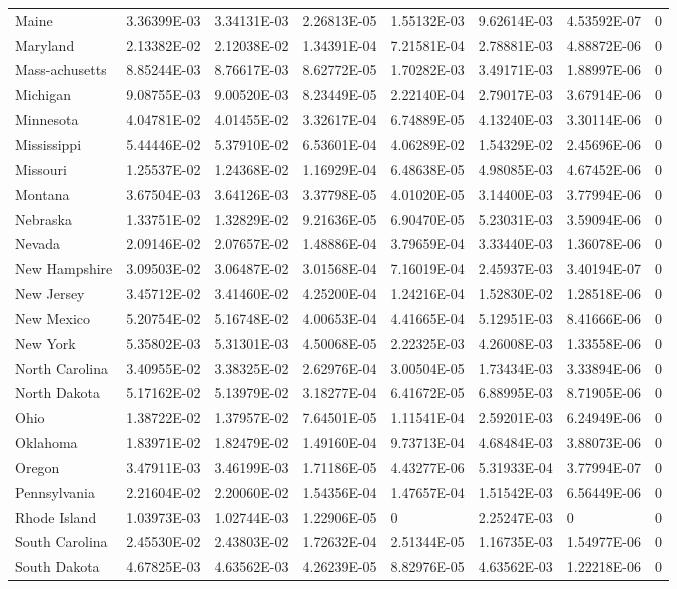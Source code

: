 \begin{longtable}[c]{p{0.75in}p{0.75in}p{0.75in}p{0.75in}p{0.75in}p{0.75in}p{0.75in}p{0.75in}}
Maine & 3.36399E-03 & 3.34131E-03 & 2.26813E-05 & 1.55132E-03 & 9.62614E-03 & 4.53592E-07 & 0 \tabularnewline
Maryland & 2.13382E-02 & 2.12038E-02 & 1.34391E-04 & 7.21581E-04 & 2.78881E-03 & 4.88872E-06 & 0 \tabularnewline
Mass-achusetts & 8.85244E-03 & 8.76617E-03 & 8.62772E-05 & 1.70282E-03 & 3.49171E-03 & 1.88997E-06 & 0 \tabularnewline
Michigan & 9.08755E-03 & 9.00520E-03 & 8.23449E-05 & 2.22140E-04 & 2.79017E-03 & 3.67914E-06 & 0 \tabularnewline
Minnesota & 4.04781E-02 & 4.01455E-02 & 3.32617E-04 & 6.74889E-05 & 4.13240E-03 & 3.30114E-06 & 0 \tabularnewline
Mississippi & 5.44446E-02 & 5.37910E-02 & 6.53601E-04 & 4.06289E-02 & 1.54329E-02 & 2.45696E-06 & 0 \tabularnewline
Missouri & 1.25537E-02 & 1.24368E-02 & 1.16929E-04 & 6.48638E-05 & 4.98085E-03 & 4.67452E-06 & 0 \tabularnewline
Montana & 3.67504E-03 & 3.64126E-03 & 3.37798E-05 & 4.01020E-05 & 3.14400E-03 & 3.77994E-06 & 0 \tabularnewline
Nebraska & 1.33751E-02 & 1.32829E-02 & 9.21636E-05 & 6.90470E-05 & 5.23031E-03 & 3.59094E-06 & 0 \tabularnewline
Nevada & 2.09146E-02 & 2.07657E-02 & 1.48886E-04 & 3.79659E-04 & 3.33440E-03 & 1.36078E-06 & 0 \tabularnewline
New Hampshire & 3.09503E-02 & 3.06487E-02 & 3.01568E-04 & 7.16019E-04 & 2.45937E-03 & 3.40194E-07 & 0 \tabularnewline
New Jersey & 3.45712E-02 & 3.41460E-02 & 4.25200E-04 & 1.24216E-04 & 1.52830E-02 & 1.28518E-06 & 0 \tabularnewline
New Mexico & 5.20754E-02 & 5.16748E-02 & 4.00653E-04 & 4.41665E-04 & 5.12951E-03 & 8.41666E-06 & 0 \tabularnewline
New York & 5.35802E-03 & 5.31301E-03 & 4.50068E-05 & 2.22325E-03 & 4.26008E-03 & 1.33558E-06 & 0 \tabularnewline
North Carolina & 3.40955E-02 & 3.38325E-02 & 2.62976E-04 & 3.00504E-05 & 1.73434E-03 & 3.33894E-06 & 0 \tabularnewline
North Dakota & 5.17162E-02 & 5.13979E-02 & 3.18277E-04 & 6.41672E-05 & 6.88995E-03 & 8.71905E-06 & 0 \tabularnewline
Ohio & 1.38722E-02 & 1.37957E-02 & 7.64501E-05 & 1.11541E-04 & 2.59201E-03 & 6.24949E-06 & 0 \tabularnewline
Oklahoma & 1.83971E-02 & 1.82479E-02 & 1.49160E-04 & 9.73713E-04 & 4.68484E-03 & 3.88073E-06 & 0 \tabularnewline
Oregon & 3.47911E-03 & 3.46199E-03 & 1.71186E-05 & 4.43277E-06 & 5.31933E-04 & 3.77994E-07 & 0 \tabularnewline
Pennsylvania & 2.21604E-02 & 2.20060E-02 & 1.54356E-04 & 1.47657E-04 & 1.51542E-03 & 6.56449E-06 & 0 \tabularnewline
Rhode Island & 1.03973E-03 & 1.02744E-03 & 1.22906E-05 & 0 & 2.25247E-03 & 0 & 0 \tabularnewline
South Carolina & 2.45530E-02 & 2.43803E-02 & 1.72632E-04 & 2.51344E-05 & 1.16735E-03 & 1.54977E-06 & 0 \tabularnewline
South Dakota & 4.67825E-03 & 4.63562E-03 & 4.26239E-05 & 8.82976E-05 & 4.63562E-03 & 1.22218E-06 & 0 \tabularnewline

\end{longtable}
